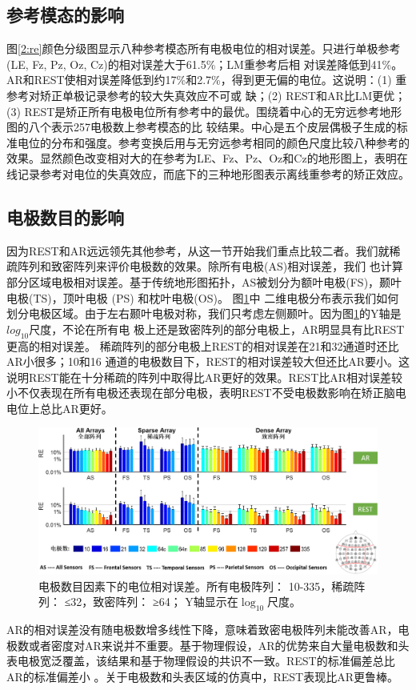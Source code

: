 \subsection{参考模态的影响}
图\ref{2:re}颜色分级图显示八种参考模态所有电极电位的相对误差。只进行单极参考(LE, Fz, Pz, Oz, Cz)的相对误差大于61.5\%；LM重参考后相
对误差降低到41\%。AR和REST使相对误差降低到约17\%和2.7\%，得到更无偏的电位。这说明：(1) 重参考对矫正单极记录参考的较大失真效应不可或
缺；(2) REST和AR比LM更优；(3) REST是矫正所有电极电位所有参考中的最优。围绕着中心的无穷远参考地形图的八个表示257电极数上参考模态的比
较结果。中心是五个皮层偶极子生成的标准电位的分布和强度。参考变换后用与无穷远参考相同的颜色尺度比较八种参考的效果。显然颜色改变相对大的在参考为LE、Fz、Pz、Oz和Cz的地形图上，表明在线记录参考对电位的失真效应，而底下的三种地形图表示离线重参考的矫正效应。
\subsection{电极数目的影响}
因为REST和AR远远领先其他参考，从这一节开始我们重点比较二者。我们就稀疏阵列和致密阵列来评价电极数的效果。除所有电极(AS)相对误差，我们
也计算部分区域电极相对误差。基于传统地形图拓扑，AS被划分为额叶电极(FS)，颞叶电极(TS)，顶叶电极 (PS) 和枕叶电极(OS)。 图\ref{2:chn}中
二维电极分布表示我们如何划分电极区域。由于左右颞叶电极对称，我们只考虑左侧颞叶。因为图\ref{2:chn}的Y轴是$log_{10}$尺度，不论在所有电
极上还是致密阵列的部分电极上，AR明显具有比REST更高的相对误差。 稀疏阵列的部分电极上REST的相对误差在21和32通道时还比AR小很多；10和16
通道的电极数目下，REST的相对误差较大但还比AR要小。这说明REST能在十分稀疏的阵列中取得比AR更好的效果。REST比AR相对误差较小不仅表现在所有电极还表现在部分电极，表明REST不受电极数影响在矫正脑电电位上总比AR更好。
\begin{figure}[!ht]
	\centering
	\includegraphics[width=15cm]{pic/JNE/figure4.png}
	\caption{电极数目因素下的电位相对误差。所有电极阵列： 10-335，稀疏阵列： ≤32，致密阵列： ≥64； Y轴显示在$\log_{10}$尺度。}
	\label{2:chn}
\end{figure}
AR的相对误差没有随电极数增多线性下降，意味着致密电极阵列未能改善AR，电极数或者密度对AR来说并不重要。基于物理假设，AR的优势来自大量电极数和头表电极宽泛覆盖，该结果和基于物理假设的共识不一致。REST的标准偏差总比AR的标准偏差小
。关于电极数和头表区域的仿真中，REST表现比AR更鲁棒。

